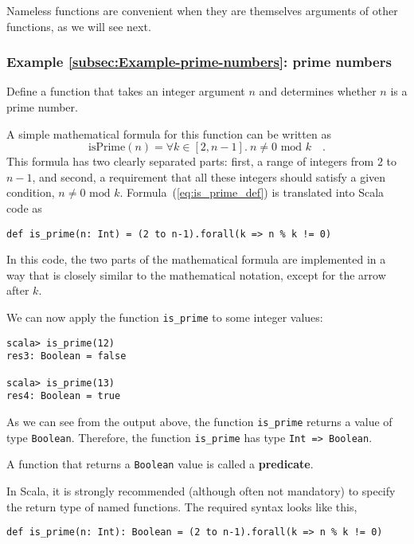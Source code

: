 Nameless functions are convenient when they are themselves arguments
of other functions, as we will see next.

\subsubsection{Example \label{subsec:Example-prime-numbers}\ref{subsec:Example-prime-numbers}:
prime numbers}

Define a function that takes an integer argument $n$ and determines
whether $n$ is a prime number.

A simple mathematical formula for this function can be written as
\begin{equation}
\text{isPrime}\left(n\right)=\forall k\in\left[2,n-1\right].\ n\neq0\text{ mod }k\quad.\label{eq:is_prime_def}
\end{equation}
This formula has two clearly separated parts: first, a range of integers
from $2$ to $n-1$, and second, a requirement that all these integers
should satisfy a given condition, $n\neq0\text{ mod }k$. Formula~(\ref{eq:is_prime_def})
is translated into Scala code as
\begin{lstlisting}
def is_prime(n: Int) = (2 to n-1).forall(k => n % k != 0)
\end{lstlisting}
In this code, the two parts of the mathematical formula are implemented
in a way that is closely similar to the mathematical notation, except
for the arrow after $k$.

We can now apply the function \lstinline!is_prime! to some integer
values:
\begin{lstlisting}
scala> is_prime(12)
res3: Boolean = false

scala> is_prime(13)
res4: Boolean = true
\end{lstlisting}
As we can see from the output above, the function \lstinline!is_prime!
returns a value of type \lstinline!Boolean!. Therefore, the function
\lstinline!is_prime! has type \lstinline!Int => Boolean!.

A function that returns a \lstinline!Boolean! value is called a \textbf{predicate}.

In Scala, it is strongly recommended (although often not mandatory)
to specify the return type of named functions. The required syntax
looks like this,
\begin{lstlisting}
def is_prime(n: Int): Boolean = (2 to n-1).forall(k => n % k != 0)
\end{lstlisting}

